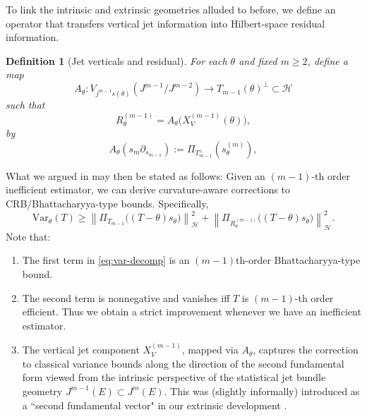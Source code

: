 \documentclass[3p,times]{elsarticle}
\newtheorem{definition}[theorem]{Definition}
\begin{document}
To link the intrinsic and extrinsic geometries alluded to before, we define an operator that transfers vertical jet information into Hilbert-space residual information.

\begin{definition}[Jet verticals and residual]
\label{prop:transfer}
For each $\theta$ and fixed $m\geq 2$, define a map
\[
A_\theta:
V_{j^{m-1}s(\theta)}(J^{m-1}/J^{m-2})
\longrightarrow 
T_{m-1}(\theta)^\perp\subset \mathcal{H}
\]
such that
\[
R^{(m-1)}_\theta = A_\theta\bigl(X_V^{(m-1)}(\theta)\bigr),
\]
by
\[
A_\theta(s_m\partial_{s_{m-1}}) 
:= 
\Pi_{T_{m-1}^\perp}(s_\theta^{(m)}),
\]
\end{definition}

What we argued in \cite{SRK,srkvector} may then be stated as follows: Given an \((m-1)\)-th order inefficient estimator, we can derive curvature-aware corrections to CRB/Bhattacharyya-type bounds. Specifically,
\begin{equation}
\mathrm{Var}_\theta(T)
\geq 
\left\|\Pi_{T_{m-1}}\bigl((T-\theta)s_\theta\bigr)\right\|_{\mathcal{H}}^2
+
\left\|\Pi_{R^{(m-1)}_\theta}\bigl((T-\theta)s_\theta\bigr)\right\|_{\mathcal{H}}^2.
\label{eq:var-decomp}
\end{equation}
Note that:
\begin{enumerate}
\item The first term in \eqref{eq:var-decomp} is an $(m-1)$th-order Bhattacharyya-type bound.
\item The second term is nonnegative and vanishes iff $T$ is $(m-1)$-th order efficient. Thus we obtain a strict improvement whenever we have an inefficient estimator.
\item The vertical jet component $X_V^{(m-1)}$, mapped via \(A_\theta\), captures the correction to classical variance bounds along the direction of the second fundamental form viewed from the intrinsic perspective of the statistical jet bundle geometry \(J^{m-1}(E)\subset J^m(E)\). This was (slightly informally) introduced as a ``second fundamental vector" in our extrinsic development \cite{SRK}.
\end{enumerate}
\end{document}
